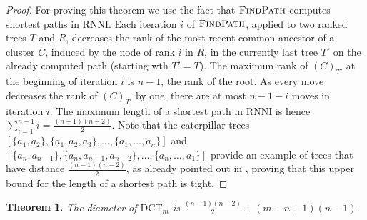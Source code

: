 \documentclass[11pt]{amsart}
\newtheorem{theorem}{Theorem}
\newcommand{\rnni}{\mathrm{RNNI}}
\newcommand{\findpath}{\textsc{FindPath}}
\newcommand{\dct}{\mathrm{DCT}}
\providecommand{\DIFaddbegin}{} %
\providecommand{\DIFaddend}{} %
\providecommand{\DIFdelbegin}{} %
\providecommand{\DIFdelend}{} %
\newcommand{\DIFscaledelfig}{0.5}
\newlength{\DIFdelgraphicswidth} %
\newlength{\DIFdelgraphicsheight} %
\newcommand{\DIFaddincludegraphics}[2][]{{\color{blue}\fbox{\DIFOincludegraphics[#1]{#2}}}} %
\newcommand{\DIFdelincludegraphics}[2][]{%
\sbox{\DIFdelgraphicsbox}{\DIFOincludegraphics[#1]{#2}}%
\settoboxwidth{\DIFdelgraphicswidth}{\DIFdelgraphicsbox} %
\settoboxtotalheight{\DIFdelgraphicsheight}{\DIFdelgraphicsbox} %
\scalebox{\DIFscaledelfig}{%
\parbox[b]{\DIFdelgraphicswidth}{\usebox{\DIFdelgraphicsbox}\\[-\baselineskip] \rule{\DIFdelgraphicswidth}{0em}}\llap{\resizebox{\DIFdelgraphicswidth}{\DIFdelgraphicsheight}{%
\setlength{\unitlength}{\DIFdelgraphicswidth}%
\begin{picture}(1,1)%
\thicklines\linethickness{2pt} %
{\color[rgb]{1,0,0}\put(0,0){\framebox(1,1){}}}%
{\color[rgb]{1,0,0}\put(0,0){\line( 1,1){1}}}%
{\color[rgb]{1,0,0}\put(0,1){\line(1,-1){1}}}%
\end{picture}%
}\hspace*{3pt}}} %
} %
\DeclareRobustCommand{\DIFaddbegin}{\DIFOaddbegin \let\includegraphics\DIFaddincludegraphics} %
\DeclareRobustCommand{\DIFaddend}{\DIFOaddend \let\includegraphics\DIFOincludegraphics} %
\DeclareRobustCommand{\DIFdelbegin}{\DIFOdelbegin \let\includegraphics\DIFdelincludegraphics} %
\DeclareRobustCommand{\DIFdelend}{\DIFOaddend \let\includegraphics\DIFOincludegraphics} %
\begin{document}
\begin{proof}
	For proving this theorem we use the fact that $\findpath$ computes shortest paths in $\rnni$.
	Each iteration $i$ of $\findpath$, applied to two ranked trees $T$ and $R$, decreases the rank of the most recent common ancestor of a cluster $C$, induced by the node of rank $i$ in $R$, in the currently last tree $T'$ on the already computed path (starting wth $T' = T$).
	The maximum rank of $(C)_{T'}$ at the beginning of iteration $i$ is $n-1$, the rank of the root.
	As every move decreases the rank of $(C)_{T'}$ by one, there are at most $n-1-i$ moves in iteration $i$.
	The maximum length of a shortest path in $\rnni$ is hence $\sum \limits_{i = 1}^{n-1} i = \frac{(n-1)(n-2)}{2}$.
	Note that the caterpillar trees $[\{a_1, a_2\}, \{a_1, a_2, a_3\}, \ldots, \{a_1, \ldots, a_n\}]$ and $[\{a_n, a_{n-1}\}, \{a_n, a_{n-1}, a_{n-2}\}, \ldots, \{a_n, \ldots, a_1\}]$ provide an example of trees that have distance $\frac{(n-1)(n-2)}{2}$, as already pointed out in \DIFdelbegin %
\DIFdelend \DIFaddbegin \autocite[Corollary 1]{Collienne2021}\DIFaddend , proving that this upper bound for the length of a shortest path is tight.
\end{proof}

\begin{theorem}
	The diameter of $\dct_m$ is $\frac{(n-1)(n-2)}{2} + (m-n+1)(n-1)$.
	\label{thm:dtt_diameter}
\end{theorem}
\end{document}
